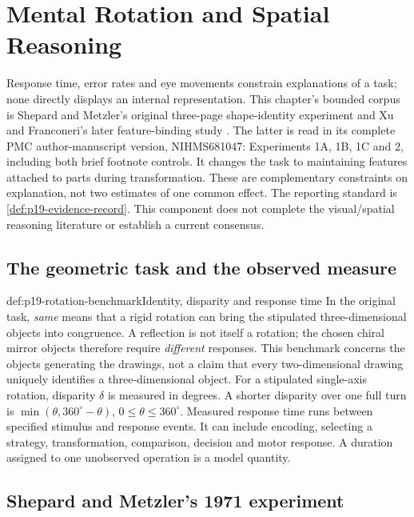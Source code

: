 \chapter{Mental Rotation and Spatial Reasoning}
\label{sec:p19-mental-rotation}

Response time, error rates and eye movements constrain explanations of
a task; none directly displays an internal representation.
This chapter's bounded corpus is Shepard and Metzler's original
three-page shape-identity experiment and Xu and Franconeri's later
feature-binding study \cite{ShepardMetzler1971MentalRotation,
XuFranconeri2015FeatureCapacity}.
The latter is read in its complete PMC author-manuscript version,
NIHMS681047: Experiments 1A, 1B, 1C and 2, including both brief
footnote controls. It changes the task to maintaining features
attached to parts during transformation. These are complementary
constraints on explanation, not two estimates of one common effect.
The reporting standard is \cref{def:p19-evidence-record}.
This component does not complete the visual/spatial reasoning
literature or establish a current consensus.

\section{The geometric task and the observed measure}
\label{sec:p19-rotation-task}

\begin{hbdefinition}{def:p19-rotation-benchmark}{Identity, disparity and response time}
In the original task, \emph{same} means that a rigid rotation can
bring the stipulated three-dimensional objects into congruence.
A reflection is not itself a rotation; the chosen chiral mirror
objects therefore require \emph{different} responses.
This benchmark concerns the objects generating the drawings,
not a claim that every two-dimensional drawing uniquely identifies
a three-dimensional object.
For a stipulated single-axis rotation, disparity \(\delta\) is
measured in degrees. A shorter disparity over one full turn is
\(\min(\theta,360^\circ-\theta)\), \(0\leq\theta\leq360^\circ\).
Measured response time runs between specified stimulus and response
events. It can include encoding, selecting a strategy, transformation,
comparison, decision and motor response. A duration assigned to
one unobserved operation is a model quantity.
\end{hbdefinition}

\section{Shepard and Metzler's 1971 experiment}
\label{sec:p19-shepard-metzler}

